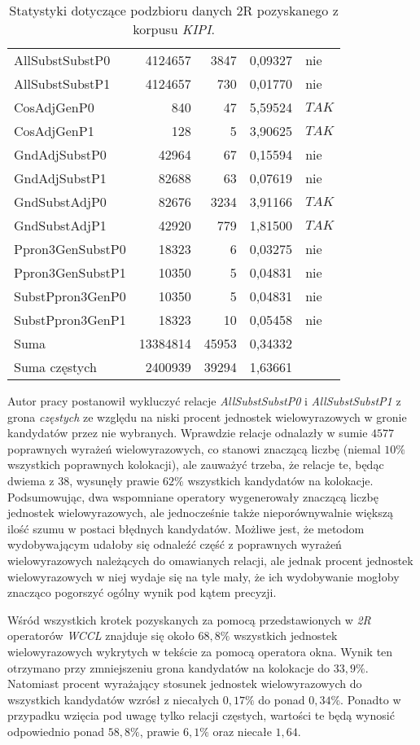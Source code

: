 \begin{table}[h!]
\begin{tabular}{ l | r | r | r | l }
	AllSubstSubstP0	&	4124657	&	3847	&	0,09327	&	nie	\\
	AllSubstSubstP1	&	4124657	&	730	&	0,01770	&	nie	\\
	CosAdjGenP0	&	840	&	47	&	5,59524	&	$ TAK $	\\
	CosAdjGenP1	&	128	&	5	&	3,90625	&	$ TAK $	\\
	GndAdjSubstP0	&	42964	&	67	&	0,15594	&	nie	\\
	GndAdjSubstP1	&	82688	&	63	&	0,07619	&	nie	\\
	GndSubstAdjP0	&	82676	&	3234	&	3,91166	&	$ TAK $	\\
	GndSubstAdjP1	&	42920	&	779	&	1,81500	&	$ TAK $	\\
	Ppron3GenSubstP0	&	18323	&	6	&	0,03275	&	nie	\\
	Ppron3GenSubstP1	&	10350	&	5	&	0,04831	&	nie	\\
	SubstPpron3GenP0	&	10350	&	5	&	0,04831	&	nie	\\
	SubstPpron3GenP1	&	18323	&	10	&	0,05458	&	nie	\\
	\midrule									
	Suma	&	13384814	&	45953	&	0,34332	&		\\
	Suma częstych	&	2400939	&	39294	&	1,63661	&		\\
	\bottomrule
\end{tabular}
\caption[Statystyki podzbioru danych \emph{KIPI} 2R]{Statystyki dotyczące podzbioru danych 2R pozyskanego z korpusu \emph{KIPI}.}
\label{KIPI_2R_stats}
\end{table}


Autor pracy postanowił wykluczyć relacje \emph{AllSubstSubstP0} i \emph{AllSubstSubstP1} z grona \emph{częstych} ze względu na niski procent jednostek wielowyrazowych w gronie kandydatów przez nie wybranych.
Wprawdzie relacje odnalazły w sumie $ 4577 $ poprawnych wyrażeń wielowyrazowych, co stanowi znaczącą liczbę (niemal $ 10 \% $ wszystkich poprawnych kolokacji), ale zauważyć trzeba, że relacje te, będąc dwiema z 38, wysunęły prawie $ 62\% $ wszystkich kandydatów na kolokacje.
Podsumowując, dwa wspomniane operatory wygenerowały znaczącą liczbę jednostek wielowyrazowych, ale jednocześnie także nieporównywalnie większą ilość szumu w postaci błędnych kandydatów.
Możliwe jest, że metodom wydobywającym udałoby się odnaleźć część z poprawnych wyrażeń wielowyrazowych należących do omawianych relacji, ale jednak procent jednostek wielowyrazowych w niej wydaje się na tyle mały, że ich wydobywanie mogłoby znacząco pogorszyć ogólny wynik pod kątem precyzji.

\par
Wśród wszystkich krotek pozyskanych za pomocą przedstawionych w \emph{2R} operatorów \emph{WCCL} znajduje się około $ 68,8\% $ wszystkich jednostek wielowyrazowych wykrytych w tekście za pomocą operatora okna.
Wynik ten otrzymano przy zmniejszeniu grona kandydatów na kolokacje do $ 33,9\% $.
Natomiast procent wyrażający stosunek jednostek wielowyrazowych do wszystkich kandydatów wzrósł z niecałych $ 0,17\% $ do ponad $ 0,34\% $.
Ponadto w przypadku wzięcia pod uwagę tylko relacji częstych, wartości te będą wynosić odpowiednio ponad $ 58,8\% $, prawie $ 6,1\% $ oraz niecałe $ 1,64 $.

